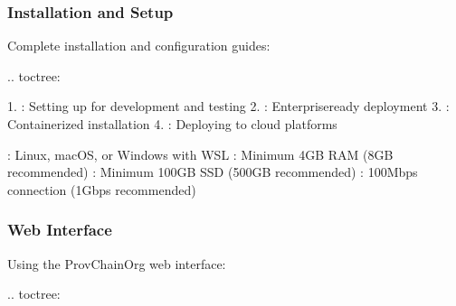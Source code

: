 \documentclass[letterpaper,10pt,english]{sphinxmanual}
\begin{document}
\subsubsection{Installation and Setup}
\label{\detokenize{user-guide/index:installation-and-setup}}
\sphinxAtStartPar
Complete installation and configuration guides:

\sphinxAtStartPar
{}
.. toctree:

\begin{sphinxVerbatim}[commandchars=\\\{\}]
 
   

\end{sphinxVerbatim}

\sphinxAtStartPar
{}
1. : Setting up for development and testing
2. : Enterprise\sphinxhyphen{}ready deployment
3. : Containerized installation
4. : Deploying to cloud platforms

\sphinxAtStartPar
{}
\sphinxhyphen{} : Linux, macOS, or Windows with WSL
\sphinxhyphen{} : Minimum 4GB RAM (8GB recommended)
\sphinxhyphen{} : Minimum 100GB SSD (500GB recommended)
\sphinxhyphen{} : 100Mbps connection (1Gbps recommended)


\subsubsection{Web Interface}
\label{\detokenize{user-guide/index:web-interface}}
\sphinxAtStartPar
Using the ProvChainOrg web interface:

\sphinxAtStartPar
{}
.. toctree:

\begin{sphinxVerbatim}[commandchars=\\\{\}]
 
  

\end{sphinxVerbatim}
\end{document}
